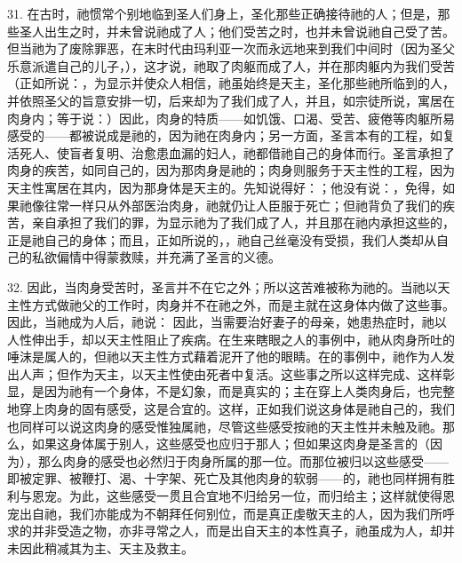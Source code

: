 31. 在古时，祂惯常个别地临到圣人们身上，圣化那些正确接待祂的人；但是，那些圣人出生之时，并未曾说祂成了人；他们受苦之时，也并未曾说祂自己受了苦。但当祂为了废除罪恶，在末时代由玛利亚一次而永远地来到我们中间时（因为圣父乐意派遣自己的儿子，），这才说，祂取了肉躯而成了人，并在那肉躯内为我们受苦（正如所说：，为显示并使众人相信，祂虽始终是天主，圣化那些祂所临到的人，并依照圣父的旨意安排一切，后来却为了我们成了人，并且，如宗徒所说，寓居在肉身内；等于说：）因此，肉身的特质——如饥饿、口渴、受苦、疲倦等肉躯所易感受的——都被说成是祂的，因为祂在肉身内；另一方面，圣言本有的工程，如复活死人、使盲者复明、治愈患血漏的妇人，祂都借祂自己的身体而行。圣言承担了肉身的疾苦，如同自己的，因为那肉身是祂的；肉身则服务于天主性的工程，因为天主性寓居在其内，因为那身体是天主的。先知说得好：；他没有说：，免得，如果祂像往常一样只从外部医治肉身，祂就仍让人臣服于死亡；但祂背负了我们的疾苦，亲自承担了我们的罪，为显示祂为了我们成了人，并且那在祂内承担这些的，正是祂自己的身体；而且，正如所说的，，祂自己丝毫没有受损，我们人类却从自己的私欲偏情中得蒙救赎，并充满了圣言的义德。\par

32. 因此，当肉身受苦时，圣言并不在它之外；所以这苦难被称为祂的。当祂以天主性方式做祂父的工作时，肉身并不在祂之外，而是主就在这身体内做了这些事。因此，当祂成为人后，祂说： 因此，当需要治好妻子的母亲，她患热症时，祂以人性伸出手，却以天主性阻止了疾病。在生来瞎眼之人的事例中，祂从肉身所吐的唾沫是属人的，但祂以天主性方式藉着泥开了他的眼睛。在的事例中，祂作为人发出人声；但作为天主，以天主性使由死者中复活。这些事之所以这样完成、这样彰显，是因为祂有一个身体，不是幻象，而是真实的；主在穿上人类肉身后，也完整地穿上肉身的固有感受，这是合宜的。这样，正如我们说这身体是祂自己的，我们也同样可以说这肉身的感受惟独属祂，尽管这些感受按祂的天主性并未触及祂。那么，如果这身体属于别人，这些感受也应归于那人；但如果这肉身是圣言的（因为），那么肉身的感受也必然归于肉身所属的那一位。而那位被归以这些感受——即被定罪、被鞭打、渴、十字架、死亡及其他肉身的软弱——的，祂也同样拥有胜利与恩宠。为此，这些感受一贯且合宜地不归给另一位，而归给主；这样就使得恩宠出自祂，我们亦能成为不朝拜任何别位，而是真正虔敬天主的人，因为我们所呼求的并非受造之物，亦非寻常之人，而是出自天主的本性真子，祂虽成为人，却并未因此稍减其为主、天主及救主。\par

